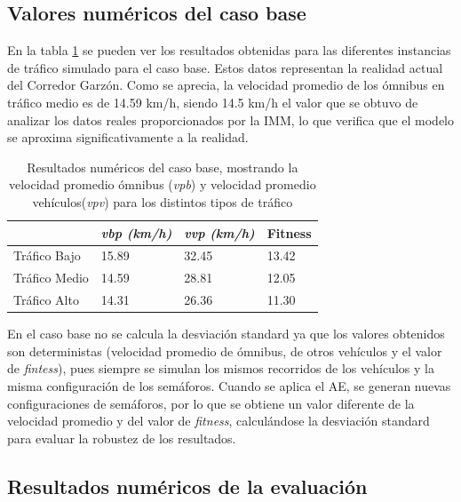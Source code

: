 \subsection{Valores numéricos del caso base}

En la tabla \ref{table:resultado_caso_base} se pueden ver los resultados obtenidas para las diferentes instancias de tráfico simulado para el caso base. Estos datos representan la realidad actual del Corredor Garzón. Como se aprecia, la velocidad promedio de los ómnibus en tráfico medio es de 14.59 km/h, siendo 14.5 km/h el valor que se obtuvo de analizar los datos reales proporcionados por la IMM, lo que verifica que el modelo se aproxima significativamente a la realidad. 
 
 \begin{table}[H]
 	\renewcommand{\arraystretch}{1.2}
 	\caption[Resultados numéricos del caso base.]{Resultados numéricos del caso base, mostrando la velocidad promedio ómnibus (\textit{vpb}) y velocidad promedio vehículos(\textit{vpv}) para los distintos tipos de tráfico}
 	\label{table:resultado_caso_base}
 	\centering
 	\begin{tabular}{p{2.5cm}p{2.5cm}p{2.5cm}p{2cm} }
 		\hline
 		&
 		\textit{vbp (km/h)}& 
 		\textit{vvp (km/h)} & 
 		Fitness \\ 
 		\hline
 		Tráfico Bajo & 15.89  & 32.45& 13.42\\
 		Tráfico Medio & 14.59  & 28.81& 12.05\\
 		Tráfico Alto & 14.31  & 26.36& 11.30\\

 		\hline
 	\end{tabular}
 \end{table}
 
 En el caso base no se calcula la desviación standard ya que los valores obtenidos son deterministas (velocidad promedio de ómnibus, de otros vehículos y el valor de \emph{fintess}), pues siempre se simulan los mismos recorridos de los vehículos y la misma configuración de los semáforos. Cuando se aplica el AE, se generan nuevas configuraciones de semáforos, por lo que se obtiene un valor diferente de la velocidad promedio y del valor de \emph{fitness}, calculándose la desviación standard para evaluar la robustez de los resultados.


\subsection{Resultados numéricos de la evaluación }

